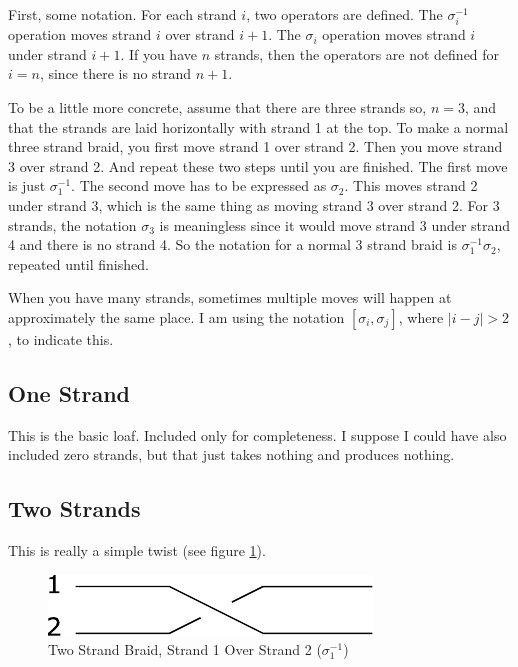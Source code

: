 \documentclass[10pt, openany]{book}
\begin{document}
First, some notation.  For each strand $i$, two operators are defined.  The $\sigma^{-1}_i$ operation moves strand $i$ over strand $i+1$.  The $\sigma_i$ operation moves strand $i$ under strand $i+1$.  If you have $n$ strands, then the operators are not defined for $i=n$, since there is no strand $n+1$.

To be a little more concrete, assume that there are three strands so, $n=3$, and that the strands are laid horizontally with strand 1 at the top.  To make a normal three strand braid, you first move strand 1 over strand 2.  Then you move strand 3 over strand 2.  And repeat these two steps until you are finished.  The first move is just $\sigma^{-1}_1$.  The second move has to be expressed as $\sigma_2$.  This moves strand 2 under strand 3, which is the same thing as moving strand 3 over strand 2.  For 3 strands, the notation $\sigma_3$ is meaningless since it would move strand 3 under strand 4 and there is no strand 4.  So the notation for a normal 3 strand braid is $\sigma^{-1}_1\sigma_2$, repeated until finished.

When you have many strands, sometimes multiple moves will happen at approximately the same place.  I am using the notation $[\sigma_i, \sigma_j]$, where $\lvert i-j \rvert > 2$, to indicate this.

\subsection{One Strand}
This is the basic loaf.  Included only for completeness.  I suppose I could have also included zero strands, but that just takes nothing and produces nothing.

\subsection{Two Strands}
This is really a simple twist (see figure \ref{fig:2Strand}).

\begin{figure}[h]
  \center
  \includegraphics{Figures/2-strands.pdf}
  \caption{Two Strand Braid, Strand 1 Over Strand 2 ($\sigma^{-1}_1$)}
  \label{fig:2Strand}
\end{figure}
\end{document}
